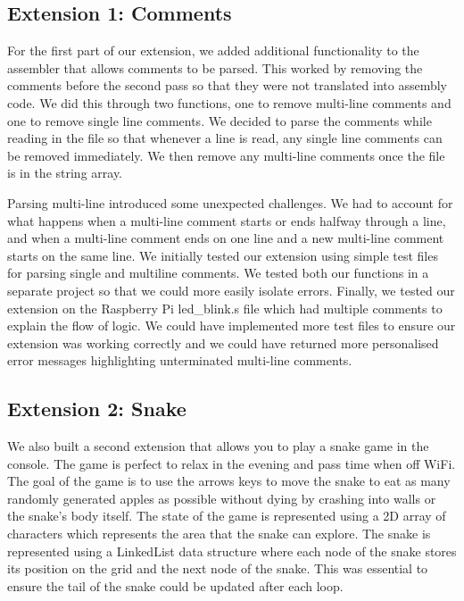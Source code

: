 \documentclass[11pt]{article}
\begin{document}
{}

\hypertarget{h.lnn9uewmn4ng}{%
\subsection{\texorpdfstring{{Extension 1:
Comments}}{Extension 1: Comments}}\label{h.lnn9uewmn4ng}}

{}

{For the first part of our extension, we added additional functionality
to the assembler that allows comments to be parsed. This worked by
removing the comments before the second pass so that they were not
translated into assembly code. We did this through two functions, one to
remove multi-line comments and one to remove single line comments. We
decided to parse the comments while reading in the file so that whenever
a line is read, any single line comments can be removed immediately. We
then remove any multi-line comments once the file is in the string
array.}

{}

{Parsing multi-line introduced some unexpected challenges. We had to
account for what happens when a multi-line comment starts or ends
halfway through a line, and when a multi-line comment ends on one line
and a new multi-line comment starts on the same line. We initially
tested our extension using simple test files for parsing single and
multiline comments. We tested both our functions in a separate project
so that we could more easily isolate errors. Finally, we tested our
extension on the Raspberry Pi led\_blink.s file which had multiple
comments to explain the flow of logic. We could have implemented more
test files to ensure our extension was working correctly and we could
have returned more personalised error messages highlighting unterminated
multi-line comments.}

\hypertarget{h.cqqy0hf95mzj}{%
\subsection{\texorpdfstring{{Extension 2:
Snake}}{Extension 2: Snake}}\label{h.cqqy0hf95mzj}}

{}

{We also built a second extension that allows you to play a snake game
in the console. The game is perfect to relax in the evening and pass
time when off WiFi. The goal of the game is to use the arrows keys to
move the snake to eat as many randomly generated apples as possible
without dying by crashing into walls or the snake's body itself. The
state of the game is represented using a 2D array of characters which
represents the area that the snake can explore. The snake is represented
using a LinkedList data structure where each node of the snake stores
its position on the grid and the next node of the snake. This was
essential to ensure the tail of the snake could be updated after each
loop.}
\end{document}
